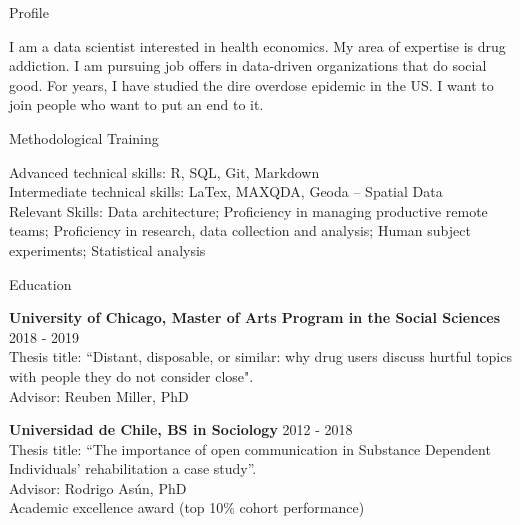 \documentclass{resume} %
\begin{document}
\begin{rSection}{Profile}

I am a data scientist interested in health economics. My area of expertise is drug addiction. I am pursuing job offers in data-driven organizations that do social good. For years, I have studied the dire overdose epidemic in the US. I want to join people who want to put an end to it. 

\end{rSection}

\begin{rSection}{Methodological Training}

Advanced technical skills: R, SQL, Git, Markdown\\
Intermediate technical skills:  LaTex, MAXQDA, Geoda – Spatial Data\\
Relevant Skills: Data architecture; Proficiency in managing productive remote teams; Proficiency in research, data collection and analysis; Human subject experiments; Statistical analysis

\end{rSection}

\begin{rSection}{Education}

{\bf University of Chicago, Master of Arts Program in the Social Sciences} \hfill {2018 - 2019}
\\
Thesis title: “Distant, disposable, or similar: why drug users discuss hurtful topics with people they do not consider close".\\
Advisor: Reuben Miller, PhD

{\textbf{Universidad de Chile, BS in Sociology}}  \hfill 2012 - 2018\\
Thesis title: “The importance of open communication in Substance Dependent Individuals' rehabilitation a case study”.\\
Advisor: Rodrigo Asún, PhD\\
Academic excellence award (top 10\% cohort performance)
 
 \end{rSection}
\end{document}
